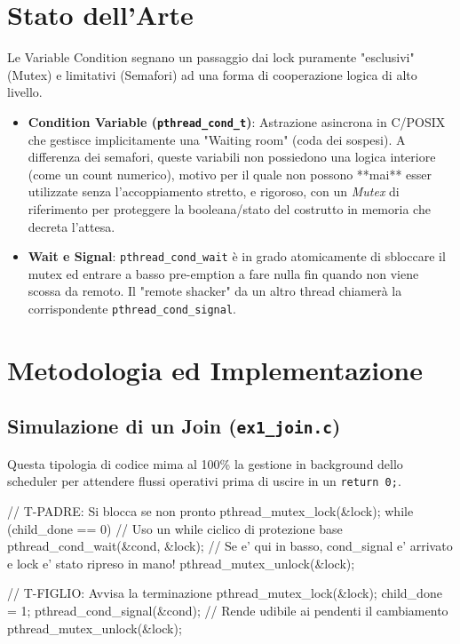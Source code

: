 \documentclass[a4paper,12pt]{article}
\begin{document}
\section{Stato dell'Arte}
Le Variable Condition segnano un passaggio dai lock puramente "esclusivi" (Mutex) e limitativi (Semafori) ad una forma di cooperazione logica di alto livello.
\begin{itemize}
    \item \textbf{Condition Variable (\texttt{pthread\_cond\_t})}: Astrazione asincrona in C/POSIX che gestisce implicitamente una "Waiting room" (coda dei sospesi). A differenza dei semafori, queste variabili non possiedono una logica interiore (come un count numerico), motivo per il quale non possono **mai** esser utilizzate senza l'accoppiamento stretto, e rigoroso, con un \textit{Mutex} di riferimento per proteggere la booleana/stato del costrutto in memoria che decreta l'attesa.
    \item \textbf{Wait e Signal}: \texttt{pthread\_cond\_wait} è in grado atomicamente di sbloccare il mutex ed entrare a basso pre-emption a fare nulla fin quando non viene scossa da remoto. Il "remote shacker" da un altro thread chiamerà la corrispondente \texttt{pthread\_cond\_signal}.
\end{itemize}

\section{Metodologia ed Implementazione}

\subsection{Simulazione di un Join (\texttt{ex1\_join.c})}
Questa tipologia di codice mima al 100\% la gestione in background dello scheduler per attendere flussi operativi prima di uscire in un \texttt{return 0;}.
\begin{ccode}
// T-PADRE: Si blocca se non pronto
pthread_mutex_lock(&lock);
while (child_done == 0) {  // Uso un while ciclico di protezione base
    pthread_cond_wait(&cond, &lock);
}
// Se e' qui in basso, cond\_signal e' arrivato e lock e' stato ripreso in mano!
pthread_mutex_unlock(&lock);

// T-FIGLIO: Avvisa la terminazione
pthread_mutex_lock(&lock);
child_done = 1;              
pthread_cond_signal(&cond); // Rende udibile ai pendenti il cambiamento
pthread_mutex_unlock(&lock);
\end{ccode}
\end{document}

